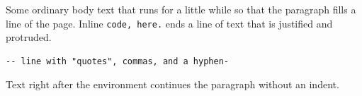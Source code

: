 \documentclass{article}
\begin{document}
Some ordinary body text that runs for a little while so that the paragraph fills a line of the page. Inline \verb|code, here.| ends a line of text that is justified and protruded.
\begin{verbatim}
-- line with "quotes", commas, and a hyphen-
\end{verbatim}
Text right after the environment continues the paragraph without an indent.
\end{document}

